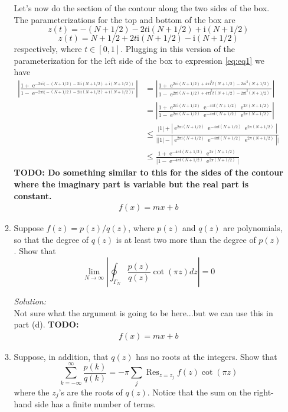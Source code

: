 \documentclass[10pt]{amsart}
\newcommand{\I}{\mathrm{i}}
\DeclareMathOperator{\E}{e}
\theoremstyle{nonumberplain}
\begin{document}
\begin{enumerate}[label={\bf {\arabic*}:}]
\begin{enumerate}
\noindent
Let's now do the section of the contour along the two sides of the box.
The parameterizations for the top and bottom of the box are
$$z(t) = -(N + 1/2) - 2 t \I (N + 1/2) + \I (N + 1/2)$$
$$z(t) = N + 1/2 + 2 t \I (N + 1/2) - \I (N + 1/2)$$
respectively, where $t \in [0,1]$.
Plugging in this version of the parameterization for the left side of the box to expression \eqref{eq:eq1} we have
\begin{align*}
\left|
	\frac
	{1 + \E^{-2 \pi \I \big( -(N + 1/2) - 2 t \I (N + 1/2) + \I (N + 1/2) \big) } }
	{1 - \E^{-2 \pi \I \big( -(N + 1/2) - 2 t \I (N + 1/2) + \I (N + 1/2) \big) } }
\right| 
&= \left|
	\frac
	{1 + \E^{2 \pi \I (N + 1/2) + 4 \pi \I^2 t (N + 1/2) -2 \pi \I^2 (N + 1/2) } }
	{1 - \E^{2 \pi \I (N + 1/2) + 4 \pi \I^2 t (N + 1/2) -2 \pi \I^2 (N + 1/2) } }
\right| \\
&= \left|
	\frac
	{1 + \E^{2 \pi \I (N + 1/2)} \E^{- 4 \pi t (N + 1/2)} \E^{2 \pi (N + 1/2) } }
	{1 - \E^{2 \pi \I (N + 1/2)} \E^{- 4 \pi t (N + 1/2)} \E^{2 \pi (N + 1/2) } }
\right| \\
&\leq \frac {|1| + |\E^{2 \pi \I (N + 1/2)} \E^{- 4 \pi t (N + 1/2)} \E^{2 \pi (N + 1/2) }| }
	{\big| |1| - |\E^{2 \pi \I (N + 1/2)} \E^{- 4 \pi t (N + 1/2)} \E^{2 \pi (N + 1/2) }| \big|} \\
&\leq \frac {1 + \E^{- 4 \pi t (N + 1/2)} \E^{2 \pi (N + 1/2) } }
	{\big| 1 - \E^{- 4 \pi t (N + 1/2)} \E^{2 \pi (N + 1/2) } \big|}
\end{align*}
\textbf{TODO: Do something similar to this for the sides of the contour where the imaginary part is variable but the real part is constant.}
\begin{align*}
f(x) = mx + b
\end{align*}


\item Suppose $f(z)=p(z) / q(z)$, where $p(z)$ and $q(z)$ are polynomials, so that the degree of $q(z)$ is at least two more than the degree of $p(z)$. Show that
$$
\lim _{N \rightarrow \infty}\left| \oint_{\Gamma_N} \frac{p(z)}{q(z)} \cot (\pi z) d z\right|=0
$$
 
\noindent
\textit{Solution:} \\
Not sure what the argument is going to be here...but we can use this in part (d).
\textbf{TODO:}
\begin{align*}
f(x) = mx + b
\end{align*}


\item Suppose, in addition, that $q(z)$ has no roots at the integers. Show that
$$
\sum_{k=-\infty}^{\infty} \frac{p(k)}{q(k)} = -\pi \sum_j \operatorname{Res}_{z=z_j} f(z) \cot (\pi z)
$$
where the $z_j$'s are the roots of $q(z)$. Notice that the sum on the
right-hand side has a finite number of terms. \\
 

\end{enumerate}
\end{enumerate}
\end{document}

